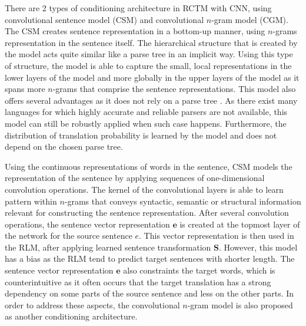 \documentclass[12pt]{extarticle}
\begin{document}
There are 2 types of conditioning architecture in RCTM with CNN, using convolutional sentence model (CSM) and convolutional $n$-gram model (CGM). The CSM creates sentence representation in a bottom-up manner, using $n$-grams representation in the sentence itself. The hierarchical structure that is created by the model acts quite similar like a parse tree in an implicit way. Using this type of structure, the model is able to capture the small, local representations in the lower layers of the model and more globally in the upper layers of the model as it spans more $n$-grams that comprise the sentence representations. This model also offers several advantages as it does not rely on a parse tree \citep{Grefenstette:2011:CSS:2002669.2002683, Socher:2012:SCT:2390948.2391084}. As there exist many languages for which highly accurate and reliable parsers are not available, this model can still be robustly applied when such case happens. Furthermore, the distribution of translation probability is learned by the model and does not depend on the chosen parse tree.

Using the continuous representations of words in the sentence, CSM models the representation of the sentence by applying sequences of one-dimensional convolution operations. The kernel of the convolutional layers is able to learn pattern within $n$-grams that conveys syntactic, semantic or structural information relevant for constructing the sentence representation. After several convolution operations, the sentence vector representation $\textbf{e}$ is created at the topmost layer of the network for the source sentence $e$. This vector representation is then used in the RLM, after applying learned sentence transformation $\textbf{S}$. However, this model has a bias as the RLM tend to predict target sentences with shorter length. The sentence vector representation $\textbf{e}$ also constraints the target words, which is counterintuitive as it often occurs that the target translation has a strong dependency on some parts of the source sentence and less on the other parts. In order to address these aspects, the convolutional $n$-gram model is also proposed as another conditioning architecture.
\end{document}
